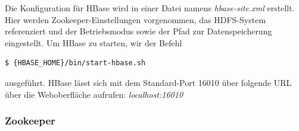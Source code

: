 Die Konfiguration für HBase wird in einer Datei namens \textit{hbase-site.xml} erstellt. Hier werden Zookeeper-Einstellungen vorgenommen, das HDFS-System referenziert und der Betriebsmodus sowie der Pfad zur Datenspeicherung eingestellt.
Um HBase zu starten, wir der Befehl 
\noindent 
\begin{lstlisting}[language=bash]
  $ {HBASE_HOME}/bin/start-hbase.sh 
\end{lstlisting}
ausgeführt. HBase lässt sich mit dem Standard-Port 16010 über folgende \ac{URL} über die Weboberfläche aufrufen: \textit{localhost:16010}

\subsubsection{Zookeeper}
